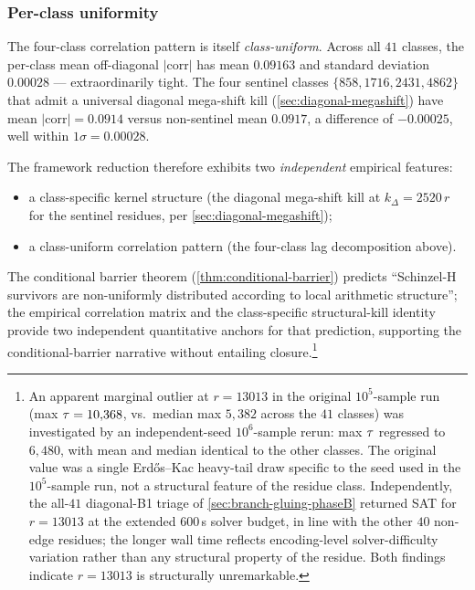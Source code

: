 \subsubsection*{Per-class uniformity}

The four-class correlation pattern is itself \emph{class-uniform}.
Across all $41$ classes, the per-class mean off-diagonal
$|\mathrm{corr}|$ has mean $0.09163$ and standard deviation
$0.00028$ --- extraordinarily tight. The four sentinel classes
$\{858, 1716, 2431, 4862\}$ that admit a universal diagonal
mega-shift kill (\cref{sec:diagonal-megashift}) have mean
$|\mathrm{corr}| = 0.0914$ versus non-sentinel mean $0.0917$, a
difference of $-0.00025$, well within $1\sigma = 0.00028$.

The framework reduction therefore exhibits two \emph{independent}
empirical features:
\begin{itemize}[leftmargin=*]
\item a class-specific kernel structure (the diagonal mega-shift
  kill at $k_\Delta = 2520\, r$ for the sentinel residues, per
  \cref{sec:diagonal-megashift});
\item a class-uniform correlation pattern (the four-class lag
  decomposition above).
\end{itemize}
The conditional barrier theorem (\cref{thm:conditional-barrier})
predicts ``Schinzel-H survivors are non-uniformly distributed
according to local arithmetic structure''; the empirical correlation
matrix and the class-specific structural-kill identity provide two
independent quantitative anchors for that prediction, supporting
the conditional-barrier narrative without entailing closure.\footnote{An
apparent marginal outlier at $r = 13013$ in the original
$10^5$-sample run (max $\tau = 10{,}368$, vs.\ median max $5{,}382$
across the $41$ classes) was investigated by an independent-seed
$10^6$-sample rerun: max $\tau$ regressed to $6{,}480$, with mean
and median identical to the other classes. The original value was a
single Erd\H{o}s--Kac heavy-tail draw specific to the seed used in
the $10^5$-sample run, not a structural feature of the residue
class. Independently, the all-$41$ diagonal-B1 triage of
\cref{sec:branch-gluing-phaseB} returned SAT for $r = 13013$ at the
extended $600$\,s solver budget, in line with the other $40$
non-edge residues; the longer wall time reflects encoding-level
solver-difficulty variation rather than any structural property of
the residue. Both findings indicate $r = 13013$ is structurally
unremarkable.}

